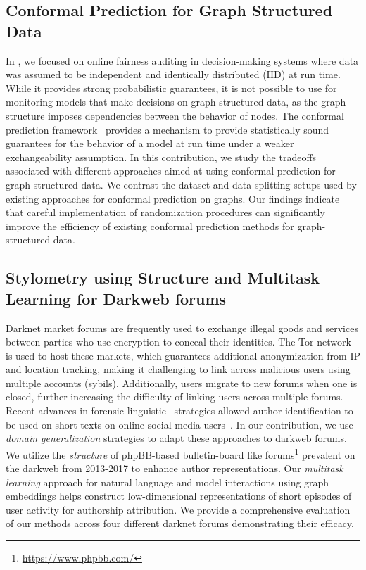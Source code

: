 \subsection{Conformal Prediction for Graph Structured Data}
In \AVOIRmethodname{}, we focused on online fairness auditing in decision-making systems where data was assumed to be independent and identically distributed (IID) at run time.
While it provides strong probabilistic guarantees, it is not possible to use \AVOIRmethodname{} for monitoring models that make decisions on graph-structured data, as the graph structure imposes dependencies between the behavior of nodes.
The conformal prediction framework~\citep{vovk2005algorithmic} provides a mechanism to provide statistically sound guarantees for the behavior of a model at run time under a weaker exchangeability assumption.
In this contribution, we study the tradeoffs associated with different approaches aimed at using conformal prediction for graph-structured data.
We contrast the dataset and data splitting setups used by existing approaches for conformal prediction on graphs.  
Our findings indicate that careful implementation of randomization procedures can significantly improve the efficiency of existing conformal prediction methods for graph-structured data.

\subsection{Stylometry using Structure and Multitask Learning for Darkweb forums}
Darknet market forums are frequently used to exchange illegal goods and services between parties who use encryption to conceal their identities.
The Tor network is used to host these markets, which guarantees additional anonymization from IP and location tracking, making it challenging to link across malicious users using multiple accounts (sybils).
Additionally, users migrate to new forums when one is closed, further increasing the difficulty of linking users across multiple forums. 
Recent advances in forensic linguistic~\citep{juola2008authorship} strategies allowed  author identification to be used on short texts on online social media users~\citep{shrestha2017convolutional,andrews2019learning}.
In our contribution, we use \textit{domain generalization} strategies to adapt these approaches to darkweb forums.
We utilize the \textit{structure} of phpBB-based bulletin-board like forums\footnote{\url{https://www.phpbb.com/}} prevalent on the darkweb from 2013-2017 to enhance author representations.
Our \textit{multitask learning} approach for natural language and model interactions using graph embeddings helps construct low-dimensional representations of short episodes of user activity for authorship attribution. 
We provide a comprehensive evaluation of our methods across four different darknet forums demonstrating their efficacy.

